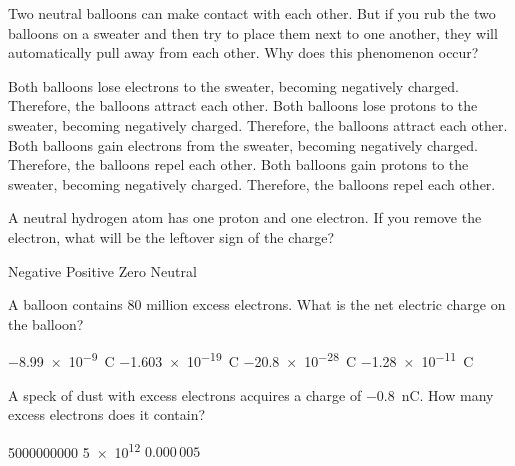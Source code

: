 \documentclass[]{exam}
\begin{document}
\begin{questions}
\question
Two neutral balloons can make contact with each other. But if you rub the two balloons on a sweater and then try to place them next to one another, they will automatically pull away from each other. Why does this phenomenon occur?

\hspace{1cm}

\clearpage
\begin{randomizechoices}
\choice Both balloons lose electrons to the sweater, becoming negatively charged. Therefore, the balloons attract each other.
\choice Both balloons lose protons to the sweater, becoming negatively charged. Therefore, the balloons attract each other.
\correctchoice Both balloons gain electrons from the sweater, becoming negatively charged. Therefore, the balloons repel each other.
\choice Both balloons gain protons to the sweater, becoming negatively charged. Therefore, the balloons repel each other.
\end{randomizechoices}




\question
A neutral hydrogen atom has one proton and one electron. If you remove the electron, what will be the leftover sign of the charge?

\begin{minipage}{0.25\textwidth}
    \begin{randomizechoices}
    \choice Negative
    \CorrectChoice Positive
    \choice Zero
    \choice Neutral
    \end{randomizechoices}
\end{minipage}%
\hspace{5mm}%
\begin{minipage}{0.2\textwidth}
    \centering
\end{minipage}

\question
A balloon contains 80 million excess electrons. What is the net electric charge on the balloon?

\begin{randomizechoices}
\choice \SI{-8.99e-9}{\coulomb}
\choice \SI{-1.603e-19}{C}
\choice \SI{-20.8e-28}{C}
\correctchoice \SI{-1.28e-11}{C}
\end{randomizechoices}

\question
A speck of dust with excess electrons acquires a charge of \SI{-0.8}{nC}. How many excess electrons does it contain?

\begin{randomizechoices}
    \correctchoice \num{5000000000}
    \choice \num{5e12}
    \choice $0.000\,005$
\end{randomizechoices}


\end{questions}
\end{document}
